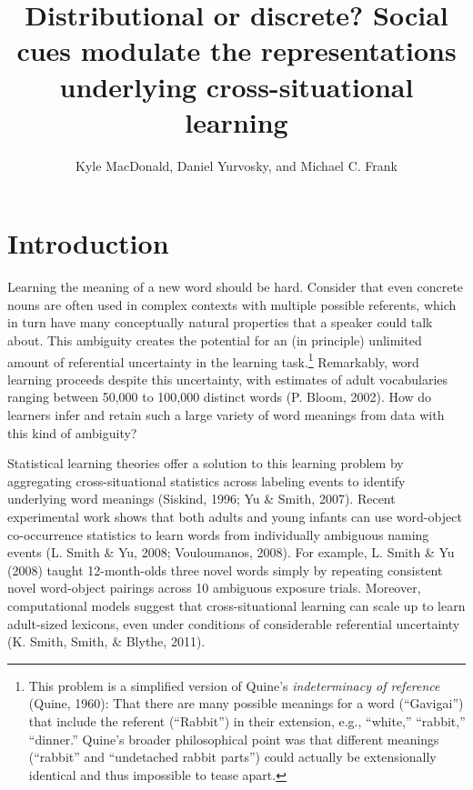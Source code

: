 \documentclass[a4paper,man,floatsintext]{apa6}
\date{}
\title{\textbf{Distributional or discrete? Social cues modulate the representations
underlying cross-situational learning}}
\author{Kyle MacDonald, Daniel Yurvosky, and Michael C. Frank}
\affiliation{Department of Psychology, Stanford University}
\begin{document}
\maketitle

\section{Introduction}\label{introduction}

Learning the meaning of a new word should be hard. Consider that even
concrete nouns are often used in complex contexts with multiple possible
referents, which in turn have many conceptually natural properties that
a speaker could talk about. This ambiguity creates the potential for an
(in principle) unlimited amount of referential uncertainty in the
learning task.\footnote{This problem is a simplified version of Quine's
  \textit{indeterminacy of reference} (Quine, 1960): That there are many
  possible meanings for a word (``Gavigai'') that include the referent
  (``Rabbit'') in their extension, e.g., ``white,'' ``rabbit,''
  ``dinner.'' Quine's broader philosophical point was that different
  meanings (``rabbit'' and ``undetached rabbit parts'') could actually
  be extensionally identical and thus impossible to tease apart.}
Remarkably, word learning proceeds despite this uncertainty, with
estimates of adult vocabularies ranging between 50,000 to 100,000
distinct words (P. Bloom, 2002). How do learners infer and retain such a
large variety of word meanings from data with this kind of ambiguity?

Statistical learning theories offer a solution to this learning problem
by aggregating cross-situational statistics across labeling events to
identify underlying word meanings (Siskind, 1996; Yu \& Smith, 2007).
Recent experimental work shows that both adults and young infants can
use word-object co-occurrence statistics to learn words from
individually ambiguous naming events (L. Smith \& Yu, 2008; Vouloumanos,
2008). For example, L. Smith \& Yu (2008) taught 12-month-olds three
novel words simply by repeating consistent novel word-object pairings
across 10 ambiguous exposure trials. Moreover, computational models
suggest that cross-situational learning can scale up to learn
adult-sized lexicons, even under conditions of considerable referential
uncertainty (K. Smith, Smith, \& Blythe, 2011).
\end{document}
